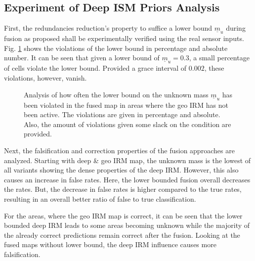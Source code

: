 \subsection{Experiment of Deep ISM Priors Analysis}
\label{subsec:exp_of_prior_analy}
First, the redundancies reduction's property to suffice a lower bound $\underline{m}_u$ during fusion as proposed  shall be experimentally verified using the real sensor inputs. Fig. \ref{tab:prior_violations} shows the violations of the lower bound in percentage and absolute number. It can be seen that given a lower bound of $\underline{m}_u = 0.3$, a small percentage of cells violate the lower bound. Provided a grace interval of $0.002$, these violations, however, vanish.
\begin{figure}[H]
	\begin{center}
		\caption{\label{tab:prior_violations}Analysis of how often the lower bound on the unknown mass $\underline{m}_u$ has been violated in the fused map in areas where the geo IRM has not been active. The violations are given in percentage and absolute. Also, the amount of violations given some slack on the condition are provided.}
	\end{center}
\end{figure}
Next, the falsification and correction properties of the fusion approaches are analyzed. Starting with deep \& geo IRM map, the unknown mass is the lowest of all variants showing the dense properties of the deep IRM. However, this also causes an increase in false rates. Here, the lower bounded fusion overall decreases the rates. But, the decrease in false rates is higher compared to the true rates, resulting in an overall better ratio of false to true classification. 

For the areas, where the geo IRM map is correct, it can be seen that the lower bounded deep IRM leads to some areas becoming unknown while the majority of the already correct predictions remain correct after the fusion. Looking at the fused maps without lower bound, the deep IRM influence causes more falsification.

